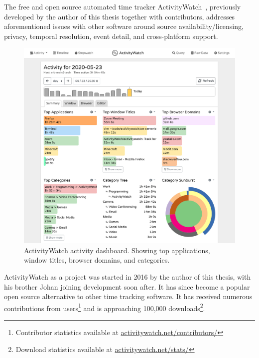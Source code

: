         The free and open source automated time tracker ActivityWatch~\cite{bjareholt_activitywatch_2020}, previously developed by the author of this thesis together with contributors, addresses aforementioned issues with other software around source availability/licensing, privacy, temporal resolution, event detail, and cross-platform support.


        \begin{figure}[h]
        \centering
        \includegraphics[width=12cm]{img/screenshot-aw-activity.png}
        \caption{ActivityWatch activity dashboard. Showing top applications, window titles, browser domains, and categories.}\label{fig:aw}
        \end{figure}

        ActivityWatch as a project was started in 2016 by the author of this thesis, with his brother Johan joining development soon after. It has since become a popular open source alternative to other time tracking software. It has received numerous contributions from users\footnote{Contributor statistics available at \href{https://activitywatch.net/contributors/}{activitywatch.net/contributors/}} and is approaching 100,000 downloads\footnote{Download statistics available at \href{https://activitywatch.net/stats/}{activitywatch.net/stats/}}.


